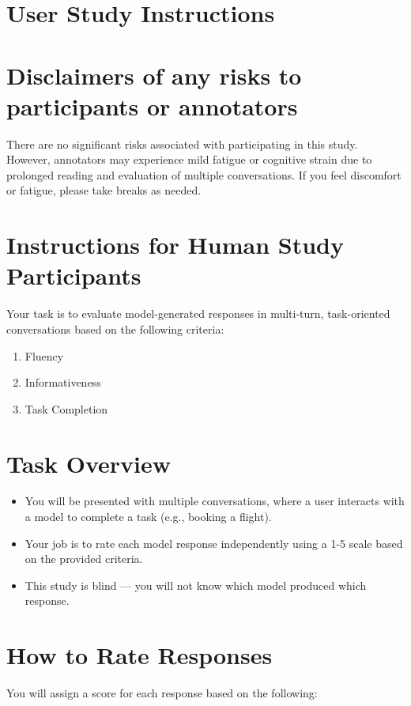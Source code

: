 \section{User Study Instructions}
\label{sec:templates}

\section*{Disclaimers of any risks to participants or annotators}

There are no significant risks associated with participating in this study. However, annotators may experience mild fatigue or cognitive strain due to prolonged reading and evaluation of multiple conversations. If you feel discomfort or fatigue, please take breaks as needed.

\section*{Instructions for Human Study Participants}

Your task is to evaluate model-generated responses in multi-turn, task-oriented conversations based on the following criteria:
\begin{enumerate}
    \item Fluency
    \item Informativeness
    \item Task Completion
\end{enumerate}

\section*{Task Overview}
\begin{itemize}
    \item You will be presented with multiple conversations, where a user interacts with a model to complete a task (e.g., booking a flight).
    \item Your job is to rate each model response independently using a 1-5 scale based on the provided criteria.
    \item This study is blind --- you will not know which model produced which response.
\end{itemize}

\section*{How to Rate Responses}
You will assign a score for each response based on the following:

